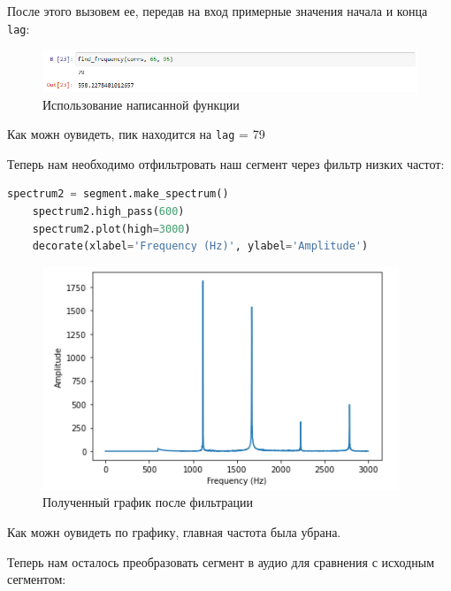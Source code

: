 \documentclass[a4paper]{article}
\begin{document}
            После этого вызовем ее, передав на вход примерные значения начала и конца \texttt{lag}:
            
            \begin{figure}[H]
                \centering
                \includegraphics[width=\textwidth]{ex_4_freq.png}
                \caption{Использование написанной функции}
                \label{fig:ex_4_freq}
            \end{figure}
            
            Как можн оувидеть, пик находится на \texttt{lag} = 79
            
            Теперь нам необходимо отфильтровать наш сегмент через фильтр низких частот:
            
\begin{lstlisting}[language=Python, caption= Фильтрация сегмента]
    spectrum2 = segment.make_spectrum()
    spectrum2.high_pass(600)
    spectrum2.plot(high=3000)
    decorate(xlabel='Frequency (Hz)', ylabel='Amplitude')
\end{lstlisting}               
            
            \begin{figure}[H]
                \centering
                \includegraphics{ex_4_filter_spectr.png}
                \caption{Полученный график после фильтрации}
                \label{fig:ex_4_filter_spectr}
            \end{figure}
            
            Как можн оувидеть по графику, главная частота была убрана.
            
            Теперь нам осталось преобразовать сегмент в аудио для сравнения с исходным сегментом:
            
\end{document}
